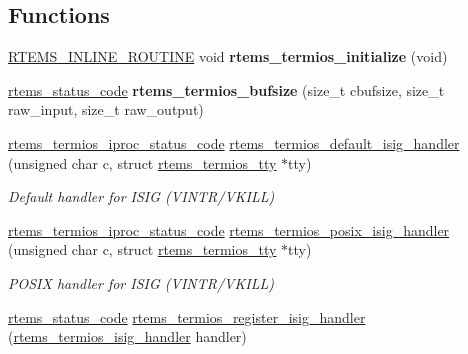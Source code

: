 \subsection*{Functions}
\begin{DoxyCompactItemize}
\item 
\mbox{\label{group__Termios_ga7e15e9e6d765ad1552dd9f6ee6444cd9}} 
\mbox{\hyperlink{group__RTEMSScoreBaseDefs_gac216239df231d5dbd15e3520b0b9313f}{R\+T\+E\+M\+S\+\_\+\+I\+N\+L\+I\+N\+E\+\_\+\+R\+O\+U\+T\+I\+NE}} void {\bfseries rtems\+\_\+termios\+\_\+initialize} (void)
\item 
\mbox{\label{group__Termios_gae6b5a571f6d9a367300c3c42655b8833}} 
\mbox{\hyperlink{group__ClassicStatus_ga545d41846817eaba6143d52ee4d9e9fe}{rtems\+\_\+status\+\_\+code}} {\bfseries rtems\+\_\+termios\+\_\+bufsize} (size\+\_\+t cbufsize, size\+\_\+t raw\+\_\+input, size\+\_\+t raw\+\_\+output)
\item 
\mbox{\hyperlink{group__Termios_ga8d00143bb99772a960e237f16437fc1b}{rtems\+\_\+termios\+\_\+iproc\+\_\+status\+\_\+code}} \mbox{\hyperlink{group__Termios_ga31143aa30ff2944008dfe4e77fb2bbf6}{rtems\+\_\+termios\+\_\+default\+\_\+isig\+\_\+handler}} (unsigned char c, struct \mbox{\hyperlink{structrtems__termios__tty}{rtems\+\_\+termios\+\_\+tty}} $\ast$tty)
\begin{DoxyCompactList}\small\item\em Default handler for I\+S\+IG (V\+I\+N\+T\+R/\+V\+K\+I\+LL) \end{DoxyCompactList}\item 
\mbox{\hyperlink{group__Termios_ga8d00143bb99772a960e237f16437fc1b}{rtems\+\_\+termios\+\_\+iproc\+\_\+status\+\_\+code}} \mbox{\hyperlink{group__Termios_gad4bc0c678b0c08941507b4259815e571}{rtems\+\_\+termios\+\_\+posix\+\_\+isig\+\_\+handler}} (unsigned char c, struct \mbox{\hyperlink{structrtems__termios__tty}{rtems\+\_\+termios\+\_\+tty}} $\ast$tty)
\begin{DoxyCompactList}\small\item\em P\+O\+S\+IX handler for I\+S\+IG (V\+I\+N\+T\+R/\+V\+K\+I\+LL) \end{DoxyCompactList}\item 
\mbox{\hyperlink{group__ClassicStatus_ga545d41846817eaba6143d52ee4d9e9fe}{rtems\+\_\+status\+\_\+code}} \mbox{\hyperlink{group__Termios_gac24c80209e7bfdf9a74119103c30e221}{rtems\+\_\+termios\+\_\+register\+\_\+isig\+\_\+handler}} (\mbox{\hyperlink{group__Termios_ga8a2610b7c8bcc2c80bbd040f0e773faf}{rtems\+\_\+termios\+\_\+isig\+\_\+handler}} handler)

\end{DoxyCompactItemize}
